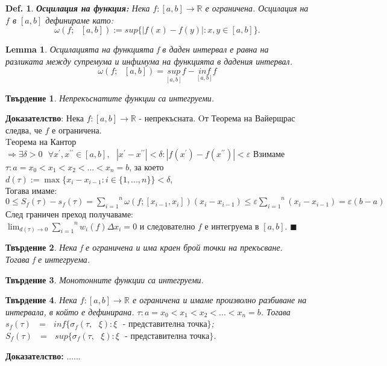 \documentclass[12pt]{article}
\newtheorem{proposition}{Твърдение}
\newtheorem{definition}{Def.}
\newtheorem{lemma}{Lemma}
\newcommand{\suma}[2]{\overset{#2}{\underset{#1}{\sum}}}
\newcommand{\spc}{\text{ }}
\begin{document}
	\begin{definition}
		\textbf{Осцилация на функция:} Нека $f:[a,b]\rightarrow\mathbb{R}$ е ограничена. Осцилация на $f$ в $[a,b]$ дефинираме като:\\
		\[\omega(f;\spc[a,b]) := sup\{|f(x) - f(y)| : x,y\in [a,b]\}.\]
	\end{definition}
	
	\begin{lemma}
		Осцилацията на функцията f в даден интервал е равна на разликата между супремума и инфимума на функцията в дадения интервал.
		\[\omega(f;\spc[a,b]) = \underset{\left[a, b\right]}{sup} f - \underset{\left[a, b\right]}{inf} f\]
	\end{lemma}
%
%

	\begin{proposition}
		Непрекъснатите функции са интегруеми.
	\end{proposition}
	\textbf{Доказателство}: Нека $f:[a,b] \rightarrow \mathbb{R}$ - непрекъсната. Oт Теорема на Вайерщрас следва, че $f$ е ограничена.\\
	Tеорема на Кантор $ \Rightarrow \exists \delta>0\spc\forall {x}^{\prime}, {x}^{\prime\prime} \in [a,b],\spc |{x}^{\prime} - {x}^{\prime\prime}|<\delta : |f({x}^{\prime}) - f({x}^{\prime\prime})| < \varepsilon $ 
	Взимаме $\tau : a=x_{0}<x_{1}<x_{2}<...<x_{n}=b$, за което\\ $d(\tau):=\max{\{x_i - x_{i-1} : i\in\{1,...,n\}\}} < \delta$,\\
	Тогава имаме:\\
	$0 \leq S_f(\tau) - s_f(\tau) = \suma{i=1}{n}\omega(f; [x_{i-1}, x_i])(x_i - x_{i-1}) \leq \varepsilon \suma{i=1}{n}(x_i - x_{i-1}) = \varepsilon(b-a)$\\
	След граничен преход получаваме:\\
	$\lim_{d(\tau) \to 0}\suma{i=1}{n}w_i(f)\Delta x_i = 0$ и следователно $f$ е интегруема в $[a,b]$. $\blacksquare$

%
%
%

	\begin{proposition}
		Нека f е ограничена и има краен брой точки на прекъсване. Тогава f е интегруема.
	\end{proposition}

	\begin{proposition}
		Монотонните функции са интегруеми.
	\end{proposition}

	\begin{proposition}
		Нека $f:\left[a, b\right] \rightarrow \mathbb{R}$ е ограничена и имаме произволно разбиване на интервала, в който е дефинирана.
		$\tau : a=x_{0}<x_{1}<x_{2}<...<x_{n}=b$.
		Тогава $s_{f}\left(\tau\right)\spc=\spc inf\{\sigma_{f}\left(\tau,\spc\xi\right) : \xi\spc\text{- представителна точка}\}$;
		$S_{f}\left(\tau\right)\spc=\spc sup\{\sigma_{f}\left(\tau,\spc\xi\right) : \xi\spc\text{- представителна точка}\}$.
	\end{proposition}
	\textbf{Доказателство:} ......
	
\end{document}
